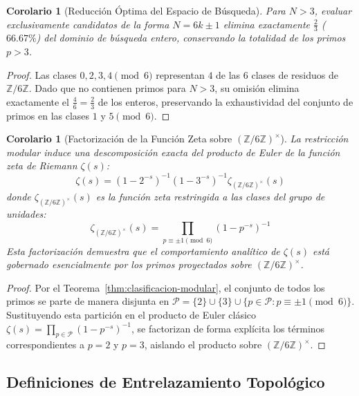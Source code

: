 \documentclass{article}
\numberwithin{equation}{section}
\newcommand{\ZZ}{\mathbb{Z}}
\theoremstyle{plain}
\newtheorem{corollary}[theorem]{Corolario}
\theoremstyle{definition}
\begin{document}
\begin{corollary}[Reducción Óptima del Espacio de Búsqueda]
\label{cor:reduccion-optima}
Para $N > 3$, evaluar exclusivamente candidatos de la forma $N = 6k \pm 1$ elimina exactamente $\frac{2}{3}$ ($66.67\%$) del dominio de búsqueda entero, conservando la totalidad de los primos $p > 3$.
\end{corollary}

\begin{proof}
Las clases $0, 2, 3, 4 \pmod{6}$ representan $4$ de las $6$ clases de residuos de $\ZZ/6\ZZ$. Dado que no contienen primos para $N > 3$, su omisión elimina exactamente el $\frac{4}{6} = \frac{2}{3}$ de los enteros, preservando la exhaustividad del conjunto de primos en las clases $1$ y $5 \pmod{6}$.
\end{proof}

\begin{corollary}[Factorización de la Función Zeta sobre $(\ZZ/6\ZZ)^\times$]
\label{cor:implicaciones-zeta}
La restricción modular induce una descomposición exacta del producto de Euler de la función zeta de Riemann $\zeta(s)$:
\begin{equation}
\zeta(s) = \left(1 - 2^{-s}\right)^{-1} \left(1 - 3^{-s}\right)^{-1} \zeta_{(\ZZ/6\ZZ)^\times}(s)
\end{equation}
donde $\zeta_{(\ZZ/6\ZZ)^\times}(s)$ es la función zeta restringida a las clases del grupo de unidades:
\begin{equation}
\zeta_{(\ZZ/6\ZZ)^\times}(s) = \prod_{p \equiv \pm 1 \pmod{6}} \left(1 - p^{-s}\right)^{-1}
\end{equation}
Esta factorización demuestra que el comportamiento analítico de $\zeta(s)$ está gobernado esencialmente por los primos proyectados sobre $(\ZZ/6\ZZ)^\times$.
\end{corollary}

\begin{proof}
Por el Teorema~\ref{thm:clasificacion-modular}, el conjunto de todos los primos se parte de manera disjunta en $\mathcal{P} = \{2\} \cup \{3\} \cup \{p \in \mathcal{P} : p \equiv \pm 1 \pmod{6}\}$. Sustituyendo esta partición en el producto de Euler clásico $\zeta(s) = \prod_{p \in \mathcal{P}} (1 - p^{-s})^{-1}$, se factorizan de forma explícita los términos correspondientes a $p=2$ y $p=3$, aislando el producto sobre $(\ZZ/6\ZZ)^\times$.
\end{proof}

\subsection{Definiciones de Entrelazamiento Topológico}
\end{document}
